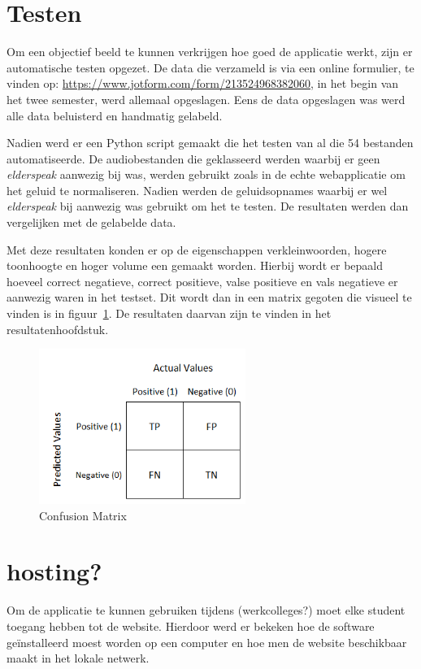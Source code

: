\section{Testen}
Om een objectief beeld te kunnen verkrijgen hoe goed de applicatie werkt, zijn er automatische testen opgezet. De data die verzameld is via een online formulier, te vinden op:  \url{https://www.jotform.com/form/213524968382060}, in het begin van het twee semester, werd allemaal opgeslagen. Eens de data opgeslagen was werd alle data beluisterd en handmatig gelabeld.

Nadien werd er een Python script gemaakt die het testen van al die 54 bestanden automatiseerde. De audiobestanden die geklasseerd werden waarbij er geen \textit{elderspeak} aanwezig bij was, werden gebruikt zoals in de echte webapplicatie om het geluid te normaliseren. Nadien werden de geluidsopnames waarbij er wel \textit{elderspeak} bij aanwezig was gebruikt om het te testen. De resultaten werden dan vergelijken met de gelabelde data.

Met deze resultaten konden er op de eigenschappen verkleinwoorden, hogere toonhoogte en hoger volume een  gemaakt worden. Hierbij wordt er bepaald hoeveel correct negatieve, correct positieve, valse positieve en vals negatieve er aanwezig waren in het testset. Dit wordt dan in een matrix gegoten die visueel te vinden is in figuur~\ref{fig:confusion_matrix}. De resultaten daarvan zijn te vinden in het resultatenhoofdstuk.

\begin{figure}
    \centering
    \includegraphics[width=0.6\textwidth]{./img/confusion_matrix}
    \caption{\label{fig:confusion_matrix} Confusion Matrix~\autocite{Jain2020}}
\end{figure}

\section{hosting?}
Om de applicatie te kunnen gebruiken tijdens (werkcolleges?) moet elke student toegang hebben tot de website. Hierdoor werd er bekeken hoe de software geïnstalleerd moest worden op een computer en hoe men de website beschikbaar maakt in het lokale netwerk.